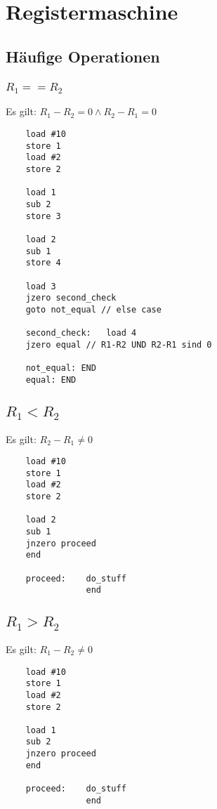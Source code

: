 \documentclass[12pt, oneside]{book}
\begin{document}
\chapter{Registermaschine}
\section{Häufige Operationen}
\subsection[Überprüfung auf Gleichheit]{$R_1 == R_2$}
Es gilt: $R_1-R_2=0 \land R_2-R_1=0$ 
\begin{lstlisting}
    load #10
    store 1
    load #2
    store 2
    
    load 1
    sub 2
    store 3
    
    load 2
    sub 1
    store 4 
    
    load 3
    jzero second_check
    goto not_equal // else case
    
    second_check:   load 4
    jzero equal // R1-R2 UND R2-R1 sind 0
    
    not_equal: END
    equal: END
\end{lstlisting}
\section[Kleiner als]{$R_1 < R_2$}
Es gilt: $R_2-R_1 \neq 0$
\begin{lstlisting}
    load #10
    store 1
    load #2
    store 2

    load 2
    sub 1
    jnzero proceed
    end

    proceed:    do_stuff
                end
\end{lstlisting}
\section[Größer als]{$R_1 > R_2$}
Es gilt: $R_1-R_2 \neq 0$
\begin{lstlisting}
    load #10
    store 1
    load #2
    store 2

    load 1
    sub 2
    jnzero proceed
    end

    proceed:    do_stuff
                end
\end{lstlisting}
\end{document}
